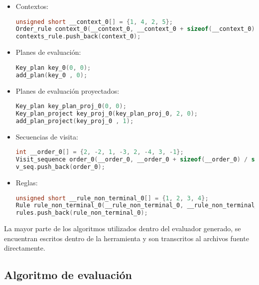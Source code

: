 \begin{itemize}
\item Contextos:
\begin{lstlisting}[language=C++, basicstyle=\scriptsize, columns=fullflexible, linewidth=14cm]
unsigned short __context_0[] = {1, 4, 2, 5};
Order_rule context_0(__context_0, __context_0 + sizeof(__context_0) / sizeof(unsigned short));
contexts_rule.push_back(context_0);
\end{lstlisting}

\item Planes de evaluación:
\begin{lstlisting}[language=C++, basicstyle=\scriptsize, columns=fullflexible, linewidth=9cm]
Key_plan key_0(0, 0);
add_plan(key_0 , 0);
\end{lstlisting}

\item Planes de evaluación proyectados:
\begin{lstlisting}[language=C++, basicstyle=\scriptsize, columns=fullflexible, linewidth=9cm]
Key_plan key_plan_proj_0(0, 0);
Key_plan_project key_proj_0(key_plan_proj_0, 2, 0);
add_plan_project(key_proj_0 , 1);
\end{lstlisting}

\item Secuencias de visita:
\begin{lstlisting}[language=C++, basicstyle=\scriptsize, columns=fullflexible, linewidth=12cm]
int __order_0[] = {2, -2, 1, -3, 2, -4, 3, -1};
Visit_sequence order_0(__order_0, __order_0 + sizeof(__order_0) / sizeof(int));
v_seq.push_back(order_0);
\end{lstlisting}

\item Reglas:
\begin{lstlisting}[language=C++, basicstyle=\scriptsize, columns=fullflexible]
unsigned short __rule_non_terminal_0[] = {1, 2, 3, 4};
Rule rule_non_terminal_0(__rule_non_terminal_0, __rule_non_terminal_0 + sizeof(__rule_non_terminal_0) / sizeof(unsigned short));
rules.push_back(rule_non_terminal_0);
\end{lstlisting}
\end{itemize}

La mayor parte de los algoritmos utilizados dentro del evaluador generado, se encuentran escritos dentro de la herramienta y son transcritos al archivos fuente directamente.

\subsection{Algoritmo de evaluación}
\label{sec:codcppalgeval}

